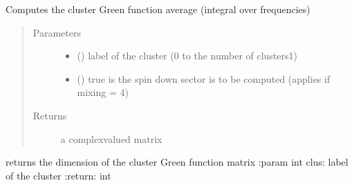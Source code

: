 \documentclass[letterpaper,10pt,english]{sphinxmanual}
\begin{document}

\begin{fulllineitems}
\label{\detokenize{functions:pyqcm.cluster_Green_function_average}}
\sphinxAtStartPar
Computes the cluster Green function average (integral over frequencies)
\begin{quote}\begin{description}
\item[{Parameters}] \leavevmode\begin{itemize}
\item {} 
\sphinxAtStartPar
{} () \textendash{} label of the cluster (0 to the number of clusters\sphinxhyphen{}1)

\item {} 
\sphinxAtStartPar
{} () \textendash{} true is the spin down sector is to be computed (applies if mixing =       4)

\end{itemize}

\item[{Returns}] \leavevmode
\sphinxAtStartPar
a complex\sphinxhyphen{}valued matrix

\end{description}\end{quote}

\end{fulllineitems}


\begin{fulllineitems}
\label{\detokenize{functions:pyqcm.cluster_Green_function_dimension}}
\sphinxAtStartPar
returns the dimension of the cluster Green function matrix
:param int clus: label of the cluster
:return: int

\end{fulllineitems}
\end{document}

